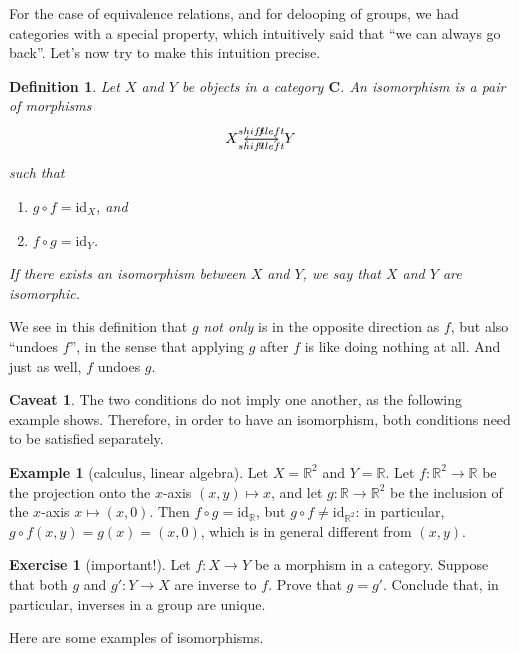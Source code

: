 \documentclass[12pt,oneside]{scrbook}
\numberwithin{equation}{section}
\theoremstyle{plain}
\newtheorem{deph}[thm]{Definition}
\theoremstyle{definition}
\newtheorem{eg}[thm]{Example}
\newtheorem*{caveat}{Caveat}
\newtheorem{ex}[thm]{Exercise}
\newcommand{\R}{\mathbb{R}}
\newcommand{\cat}[1]{{\mathbf{#1}}} %
\newcommand{\ar}[2][]{\arrow{#2}{#1}}
\DeclareMathOperator{\1}{\mathbbm{1}}
\DeclareMathOperator{\2}{\mathbbm{2}}
\newcommand{\id}{\mathrm{id}} %
\begin{document}
For the case of equivalence relations, and for delooping of groups, we had categories with a special property, which intuitively said that ``we can always go back''. Let's now try to make this intuition precise.

\begin{deph}\label{defiso}
 Let $X$ and $Y$ be objects in a category $\cat{C}$. An \emph{isomorphism} is a pair of morphisms 
 $$
 \begin{tikzcd}
  X \ar[shift left]{r}{f} & Y \ar[shift left]{l}{g}
 \end{tikzcd}
 $$
 such that 
 \begin{enumerate}
  \item $g\circ f = \id_X$, and
  \item $f\circ g = \id_Y$. 
 \end{enumerate}
 If there exists an isomorphism between $X$ and $Y$, we say that $X$ and $Y$ are \emph{isomorphic}.
\end{deph}

We see in this definition that $g$ \emph{not only} is in the opposite direction as $f$, but also ``undoes $f$'', in the sense that applying $g$ after $f$ is like doing nothing at all. And just as well, $f$ undoes $g$.

\begin{caveat}
 The two conditions do not imply one another, as the following example shows. Therefore, in order to have an isomorphism, both conditions need to be satisfied separately.
\end{caveat}

\begin{eg}[calculus, linear algebra]
 Let $X=\R^2$ and $Y=\R$. Let $f:\R^2\to \R$ be the projection onto the $x$-axis $(x,y)\mapsto x$, and let $g:\R\to \R^2$ be the inclusion of the $x$-axis $x\mapsto (x,0)$. Then $f\circ g = \id_{\R}$, but $g\circ f \ne \id_{\R^2}$: in particular, $g\circ f(x,y) = g(x) = (x,0)$, which is in general different from $(x,y)$. 
\end{eg}

\begin{ex}[important!]
 Let $f:X\to Y$ be a morphism in a category. Suppose that both $g$ and $g':Y\to X$ are inverse to $f$. Prove that $g=g'$. Conclude that, in particular, inverses in a group are unique. 
\end{ex}

Here are some examples of isomorphisms.
\end{document}
